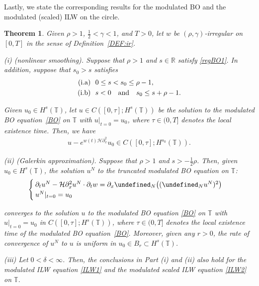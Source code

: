 \documentclass[letterpaper, 11pt,  reqno]{amsart}
\newtheorem{theorem}{Theorem} [section]
\newcommand{\1}{\hspace{0.5mm}\text{I}\hspace{0.5mm}}
\newcommand{\noi}{\noindent}
\newcommand{\R}{\mathbb{R}}
\newcommand{\T}{\mathbb{T}}
\let\P= \undefined
\newcommand{\P}{\mathbf{P}}
\renewcommand{\H}{\mathcal{H}}
\newcommand{\dl}{\delta}
\newcommand{\g}{\gamma}
\newcommand{\dx}{\partial_x}
\newcommand{\dt}{\partial_t}
\numberwithin{equation}{section}
\numberwithin{theorem}{section}
\begin{document}
Lastly, we state the corresponding results
for the modulated BO and the modulated (scaled) ILW
on the circle.

\begin{theorem}\label{THM:G3}
Given $\rho > 1$,  $\frac12< \g < 1$, and $T> 0$, 
let  $w$ be $(\rho,\g)$-irregular on $[0, T]$ in the sense of Definition~\ref{DEF:ir}.


\smallskip


\noi
\textup{(i) (nonlinear smoothing).}
Suppose that $\rho > 1$ and $s\in \R$
satisfy \eqref{regBO1}.
In addition, suppose that $s_0 > s$ satisfies
\begin{align}
\begin{split}
\textup{(i.a)} &\ \
0 \le s < s_0 \le \rho - 1,\\
\textup{(i.b)} &\ \
 s <0
\quad 
\text{and}\quad 
s_0 \le s + \rho - 1.
\end{split}
\label{regBO2}
\end{align}


\noi
Given $u_0 \in H^s(\T)$, 
let $u
\in C([0, \tau]; H^s(\T))$ be the  solution 
to the modulated BO equation~\eqref{BO}
on $\T$
with $u|_{t = 0} = u_0$, 
where 
$\tau \in (0,  T]$ denotes the local existence time.
Then, we have 
\begin{align*}
 u - e^{w(t) \H\dx^2}u_0 \in C([0, \tau]; H^{s_0}(\T)).
\end{align*}



\smallskip

\noi
\textup{(ii) (Galerkin approximation).}
Suppose that 
$ \rho >  1$
and $ 
s > - \tfrac 12\rho$.
Then, given $u_0 \in H^s(\T)$, 
the solution $u^N$ to the truncated modulated BO equation 
on $\T$\textup{:}
\begin{equation*}
\begin{cases}
\dt u^N- \H  \dx^2 u^N \cdot \dt w =\dx \P_N\big((\P_Nu^N)^2\big)\\
u^N|_{t = 0} = u_0
\end{cases}
\end{equation*}

\noi
converges to the solution $u$
to the modulated BO equation \eqref{BO} on $\T$
with $u|_{t = 0} = u_0$
in $C([0, \tau]; H^s(\T))$, 
where $\tau \in (0, T]$ denotes the local existence time of the modulated BO equation~\eqref{BO}.
Moreover, 
given any $r > 0$, 
the rate of convergence of $u^N$ to $u$ is
uniform in $u_0 \in B_r \subset H^s(\T)$. 



\smallskip

\noi
\textup{(iii)}
Let $0<  \dl < \infty$.
Then, 
the conclusions in Part (i) and (ii) 
also hold
for the modulated
ILW equation \eqref{ILW1}
and
 the modulated
scaled ILW equation \eqref{ILW2}
on $\T$.



\end{theorem}
\end{document}

